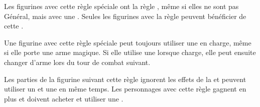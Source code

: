 Les figurines avec cette règle spéciale ont la règle \inspiringpresence{}, même si elles ne sont pas Général, mais avec une . Seules les figurines avec la règle \serfs{} peuvent bénéficier de cette \inspiringpresence{}.

\armyspecialruleentry{\jousting}

Une figurine avec cette règle spéciale peut toujours utiliser une \lance{} en charge, même si elle porte une arme magique. Si elle utilise une \lance{} lorsque charge, elle peut ensuite changer d'arme lors du tour de combat suivant.

\armyspecialruleentry{\questingoath}

Les parties de la figurine suivant cette règle ignorent les effets de la \fear{} et peuvent utiliser un \shield{} et une \gw{} en même temps. Les personnages avec cette règle gagnent en plus  et doivent acheter et utiliser une \gw{}.


\closearmyspecialrules




